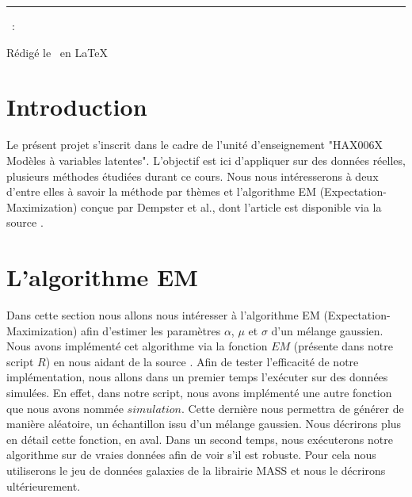 \documentclass[a4paper,french,10pt]{article}
\begin{document}
	
	\title{\vspace{-1in}} %
	\author{} %
	\date{} %
	\maketitle %
	
	\usebox{\myReportTitle}
	\vspace{1in} %
	
	{\centering \huge \assignmentName \par}
	{\centering \noindent\rule{4in}{0.1pt} \par}
	\vspace{0.05in}
	{\centering \courseCode~: \courseName~ \par}
	{\centering Rédigé le \pubDate\ en \LaTeX \par}
	\vspace{1in}
	
	\tableofcontents
	\newpage
	
	

\section{Introduction}
Le présent projet s'inscrit dans le cadre de l'unité d'enseignement "HAX006X Modèles à variables latentes". L'objectif est ici d'appliquer sur des données réelles, plusieurs méthodes étudiées durant ce cours. Nous nous intéresserons à deux d'entre elles à savoir la méthode par thèmes et  l'algorithme EM (Expectation-Maximization) conçue par Dempster et al., dont l'article est disponible via la source \cite{article}.

\newpage

\section{L'algorithme EM}
Dans cette section nous allons nous intéresser à l'algorithme EM (Expectation-Maximization) afin d'estimer les paramètres $\alpha$, $\mu$ et $\sigma$ d'un mélange gaussien. Nous avons implémenté cet algorithme via la fonction $EM$ (présente dans notre script $R$) en nous aidant de la source \cite{EM_algorithm}. Afin de tester l'efficacité de notre implémentation, nous allons dans un premier temps l'exécuter sur des données simulées. En effet, dans notre script, nous avons implémenté une autre fonction que nous avons nommée $simulation$. Cette dernière nous permettra de générer de manière aléatoire, un échantillon issu d'un mélange gaussien. Nous décrirons plus en détail cette fonction, en aval. Dans un second temps, nous exécuterons notre algorithme sur de vraies données afin de voir s'il est robuste. Pour cela nous utiliserons le jeu de données galaxies de la librairie MASS et nous le décrirons ultérieurement.
\end{document}
